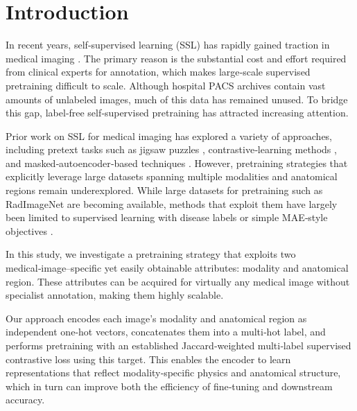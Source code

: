 \documentclass[final,1p,times]{elsarticle}
\newcommand{\revadd}[1]{#1}
\DeclareRobustCommand{\revdel}[1]{}
\begin{document}


\section{Introduction}
\label{sec1}
In recent years, self‑supervised learning (SSL) has rapidly gained traction in medical imaging \cite{uelwer_survey_2025}\cite{rani_self-supervised_2024}.
The primary reason is the substantial cost and effort required from clinical experts for annotation, which makes large‑scale supervised pretraining difficult to scale.
Although hospital PACS archives contain vast amounts of unlabeled images, much of this data has remained unused.
To bridge this gap, label‑free self‑supervised pretraining has attracted increasing attention.

Prior work on SSL for medical imaging has explored a variety of approaches, including pretext tasks such as jigsaw puzzles \cite{sugawara_breast_2025}, contrastive‑learning methods \cite{wu_distributed_2022}, and masked‑autoencoder‑based techniques \cite{zhuang_mim_2025}.
However, pretraining strategies that explicitly leverage large datasets spanning multiple modalities and anatomical regions remain underexplored.
While large datasets for pretraining such as RadImageNet \cite{mei_radimagenet_2022} are becoming available, methods that exploit them have largely been limited to supervised learning with disease labels or simple MAE‑style objectives \cite{mei_radimagenet_2022}\cite{liu2024vis}.

In this study, we \revdel{propose a pretraining method}\revadd{investigate a pretraining strategy} that exploits two medical‑image–specific yet easily obtainable attributes: modality and anatomical region. These attributes can be acquired for virtually any medical image without specialist annotation, making them highly scalable.

Our approach encodes each image’s modality and anatomical region as independent one‑hot vectors, concatenates them into a multi‑hot label, and performs pretraining with \revdel{a distance-aware loss}\revadd{an established Jaccard‑weighted multi‑label supervised contrastive loss} using this target.
This enables the encoder to learn representations that reflect modality‑specific physics and anatomical structure, which in turn can improve both the efficiency of fine‑tuning and downstream accuracy.
\end{document}
